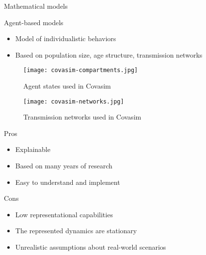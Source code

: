 \begin{frame}[allowframebreaks]{Mathematical models}
    \framebreak

    Agent-based models \cite{kerrCovasimAgentbasedModel2021,silvaCOVIDABSAgentbasedModel2020,hoertelStochasticAgentbasedModel2020}
    \begin{itemize}
        \item Model of individualistic behaviors
        \item Based on population size, age structure, transmission networks
    \end{itemize}

    \framebreak

    \begin{figure}[!htb]
        \centering
        \texttt{[image: covasim-compartments.jpg]}
        \caption[Agent states used in Covasim]{Agent states used in Covasim \cite{kerrCovasimAgentbasedModel2021}}
        \label{fig:covasim-compartments}
    \end{figure}

    \framebreak

    \begin{figure}[!htb]
        \centering
        \texttt{[image: covasim-networks.jpg]}
        \caption[Transmission networks used in Covasim]{Transmission networks used in Covasim \cite{kerrCovasimAgentbasedModel2021}}
        \label{fig:covasim-networks}
    \end{figure}

    \framebreak

    \begin{exampleblock}{Pros}
    \begin{itemize}
        \item Explainable
        \item Based on many years of research
        \item Easy to understand and implement
    \end{itemize}
    \end{exampleblock}

    \begin{alertblock}{Cons}
    \begin{itemize}
        \item Low representational capabilities
        \item The represented dynamics are stationary
        \item Unrealistic assumptions about real-world scenarios
    \end{itemize}
    \end{alertblock}

\end{frame}

